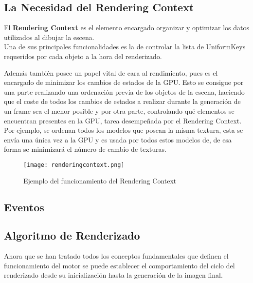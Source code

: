 \subsection{La Necesidad del Rendering Context}
El \textbf{Rendering Context} es el elemento encargado organizar y optimizar los datos utilizados al dibujar la escena.\\

Una de sus principales funcionalidades es la de controlar la lista de UniformKeys requeridos por cada objeto a la hora del renderizado.

Además también posee un papel vital de cara al rendimiento, pues es el encargado de minimizar los cambios de estados de la GPU. Esto se consigue por una parte realizando una ordenación previa de los objetos de la escena, haciendo que el coste de todos los cambios de estados a realizar durante la generación de un frame sea el menor posible y por otra parte, controlando qué elementos se encuentran presentes en la GPU, tarea desempeñada por el Rendering Context.\\

Por ejemplo, se ordenan todos los modelos que posean la misma textura, esta se envía una única vez a la GPU y es usada por todos estos modelos de, de esa forma se minimizará el número de cambio de texturas.\\

\begin{figure}[h!]
\begin{center}
\texttt{[image: renderingcontext.png]}
\end{center}
\caption[Ejemplo del funcionamiento del Rendering Context]{Ejemplo del funcionamiento del Rendering Context}
\label{fig:renderingcontext}
\end{figure}

\subsection{Eventos}

\subsection{Algoritmo de Renderizado}
Ahora que se han tratado todos los conceptos fundamentales que definen el funcionamiento del motor se puede establecer el comportamiento del ciclo del renderizado desde su inicialización hasta la generación de la imagen final.\\

